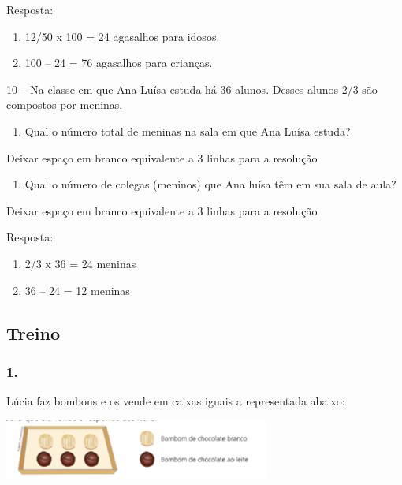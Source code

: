 Resposta:

\begin{enumerate}
\def\labelenumi{\alph{enumi})}
\item
  12/50 x 100 = 24 agasalhos para idosos.
\item
  100 -- 24 = 76 agasalhos para crianças.
\end{enumerate}

10 -- Na classe em que Ana Luísa estuda há 36 alunos. Desses alunos 2/3
são compostos por meninas.

\begin{enumerate}
\def\labelenumi{\alph{enumi})}
\item
  Qual o número total de meninas na sala em que Ana Luísa estuda?
\end{enumerate}

Deixar espaço em branco equivalente a 3 linhas para a resolução

\begin{enumerate}
\def\labelenumi{\alph{enumi})}
\item
  Qual o número de colegas (meninos) que Ana luísa têm em sua sala de
  aula?
\end{enumerate}

Deixar espaço em branco equivalente a 3 linhas para a resolução

Resposta:

\begin{enumerate}
\def\labelenumi{\alph{enumi})}
\item
  2/3 x 36 = 24 meninas
\item
  36 -- 24 = 12 meninas
\end{enumerate}

\subsection{Treino}\label{treino-8}

\subsubsection{1.}\label{section-114}

Lúcia faz bombons e os vende em caixas iguais a representada abaixo:

\includegraphics[width=3.43363in,height=0.77507in]{media/image122.png}

